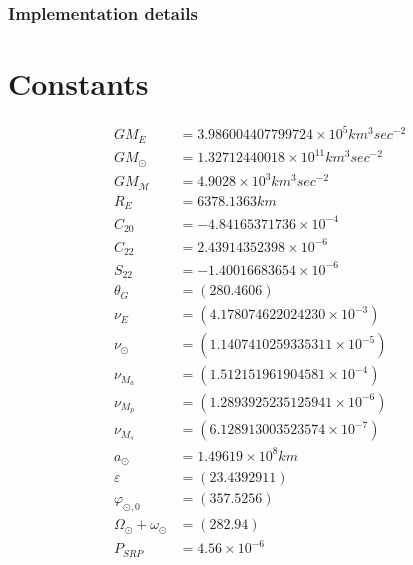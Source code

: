 \documentclass{article}
\begin{document}
\subsubsection{Implementation details}
\section{Constants}

\begin{align}
GM_E &=3.986004407799724\times 10^5 km^3 sec^{-2} \\
GM_\odot &= 1.32712440018\times 10^{11}km^3 sec^{-2} \\
GM_{\mathcal M} &=4.9028\times 10^{3}km^3 sec^{-2} \\
R_E &=6378.1363 km\\
C_{20} &= -4.84165371736\times 10^{-4}\\
C_{22} &= 2.43914352398\times 10^{-6}\\
S_{22} &=-1.40016683654\times 10^{-6}\\
\theta_G &= (280.4606)\\
\nu_E  &=(4.178074622024230\times 10^{-3})\\
\nu_\odot &=  (1.1407410259335311\times 10^{-5})\\
\nu_{M_a} &=  (1.512151961904581\times 10^{-4})\\
\nu_{M_p} &=  (1.2893925235125941\times 10^{-6})\\
\nu_{M_s} &=  (6.128913003523574\times 10^{-7})\\
a_\odot &= 1.49619 \times 10^8 km\\
\varepsilon&= (23.4392911)\\
\varphi_{\odot,0} &= (357.5256)\\
\Omega_\odot + \omega_\odot &=  (282.94) \\
P_{SRP} &=4.56\times 10^{-6}
\end{align}
\end{document}
